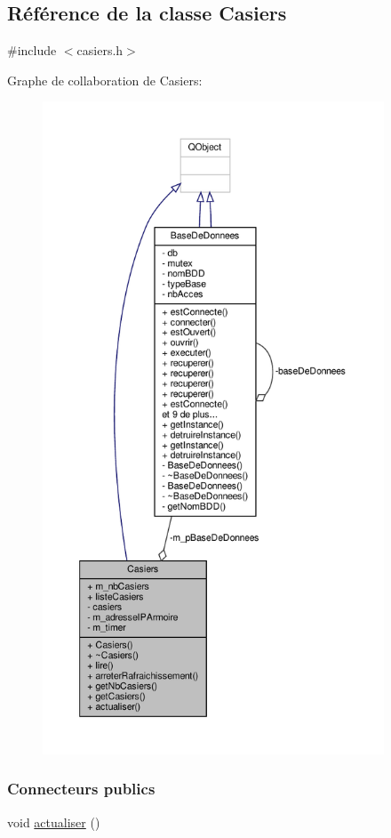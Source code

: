 \hypertarget{class_casiers}{}\subsection{Référence de la classe Casiers}
\label{class_casiers}


{\ttfamily \#include $<$casiers.\+h$>$}



Graphe de collaboration de Casiers\+:\nopagebreak
\begin{figure}[H]
\begin{center}
\leavevmode
\includegraphics[height=550pt]{class_casiers__coll__graph}
\end{center}
\end{figure}
\subsubsection*{Connecteurs publics}
\begin{DoxyCompactItemize}
\item 
void \hyperlink{class_casiers_a53ff5feefb50f5010943c94916be060f}{actualiser} ()
\end{DoxyCompactItemize}
